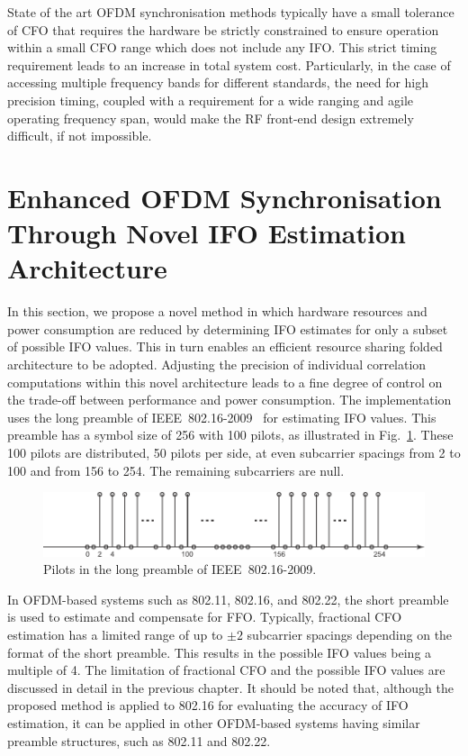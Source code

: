 State of the art OFDM synchronisation methods typically have a small tolerance of CFO that requires the hardware be strictly constrained to ensure operation within a small CFO range which does not include any IFO.
This strict timing requirement leads to an increase in total system cost. Particularly, in the case of accessing multiple frequency bands for different standards, the need for high precision timing, coupled with a requirement for a wide ranging and agile operating frequency span, would make the RF front-end design extremely difficult, if not impossible.

\section{Enhanced OFDM Synchronisation Through Novel IFO Estimation Architecture}
In this section, we propose a novel method in which hardware resources and power consumption are reduced by determining IFO estimates for only a subset of possible IFO values. This in turn enables an efficient resource sharing folded architecture to be adopted. Adjusting the precision of individual correlation computations within this novel architecture leads to a fine degree of control on the trade-off between performance and power consumption.
The implementation uses the long preamble of IEEE~802.16-2009~\cite{IEEE80216} for estimating IFO values.
This preamble has a symbol size of 256 with 100 pilots, as illustrated in Fig.~\ref{fig:long_pre}.
These 100 pilots are distributed, 50 pilots per side, at even subcarrier spacings from 2 to 100 and from 156 to 254. The remaining subcarriers are null.
\begin{figure}[b]
    \centerline{\includegraphics [width=1\columnwidth] {figures/long_pre.pdf} }
    \caption{Pilots in the long preamble of IEEE~802.16-2009.}
    \label{fig:long_pre}
\end{figure}
In OFDM-based systems such as 802.11, 802.16, and 802.22, the short preamble is used to estimate and compensate for FFO.
Typically, fractional CFO estimation has a limited range of up to ${\pm}2$ subcarrier spacings depending on the format of the short preamble.
This results in the possible IFO values being a multiple of 4. The limitation of fractional CFO and the possible IFO values are discussed in detail in the previous chapter.
It should be noted that, although the proposed method is applied to 802.16 for evaluating the accuracy of IFO estimation, it can be applied in other OFDM-based systems having similar preamble structures, such as 802.11 and 802.22.

